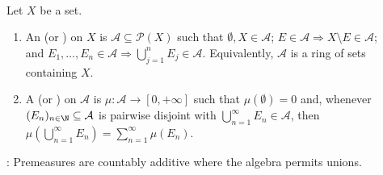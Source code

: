 \begin{definition} \label{def:algebra-field-and-measure-on-algebra} \\
Let $X$ be a set.
\begin{enumerate}[label=(\roman*)]
\setlength{\itemsep}{0pt}
\item An  (or ) on $X$ is $\mathcal{A}\subseteq\mathcal{P}(X)$ such that $\emptyset,X\in\mathcal{A}$; $E\in\mathcal{A}\Rightarrow X\setminus E\in\mathcal{A}$;\\
and $E_1,\ldots,E_n\in\mathcal{A}\Rightarrow\bigcup_{j=1}^{n}E_j\in\mathcal{A}$. Equivalently, $\mathcal{A}$ is a ring of sets containing $X$.
\item A  (or ) on $\mathcal{A}$ is $\mu:\mathcal{A}\to[0,+\infty]$ such that $\mu(\emptyset)=0$ and, whenever $(E_n)_{n\in\N}\subseteq\mathcal{A}$ is pairwise disjoint with $\bigcup_{n=1}^{\infty}E_n\in\mathcal{A}$, then $\mu\left(\bigcup_{n=1}^{\infty}E_n\right)=\sum_{n=1}^{\infty}\mu(E_n)$.
\end{enumerate}
: Premeasures are countably additive where the algebra permits unions.
\end{definition}


